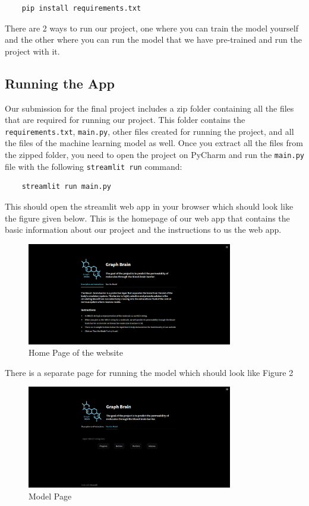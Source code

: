 \documentclass[fontsize=11pt]{article}
\begin{document}
\begin{verbatim}
    pip install requirements.txt
\end{verbatim}

There are 2 ways to run our project, one where you can train the model yourself and the other where you can run the model that we have pre-trained and run the project with it.

\subsection*{Running the App}
Our submission for the final project includes a zip folder containing all the files that are required for running our project. This folder contains the \texttt{requirements.txt}, \texttt{main.py}, other files created for running the project, and all the files of the machine learning model as well. Once you extract all the files from the zipped folder, you need to open the project on PyCharm and run the \texttt{main.py} file with the following \texttt{streamlit run} command:

\begin{verbatim}
    streamlit run main.py
\end{verbatim}

This should open the streamlit web app in your browser which should look like the figure given below. This is the homepage of our web app that contains the basic information about our project and the instructions to us the web app.

\begin{figure}[ht]
    \centering
    \includegraphics[width=0.8\textwidth]{webapp1.png}
    \caption{Home Page of the website}
    \label{fig:homepage}
\end{figure}

There is a separate page for running the model which should look like Figure 2

\begin{figure}[ht]
    \centering
    \includegraphics[width=0.8\textwidth]{webapp2.png}
    \caption{Model Page}
    \label{fig:modelpage}
\end{figure}
\end{document}
